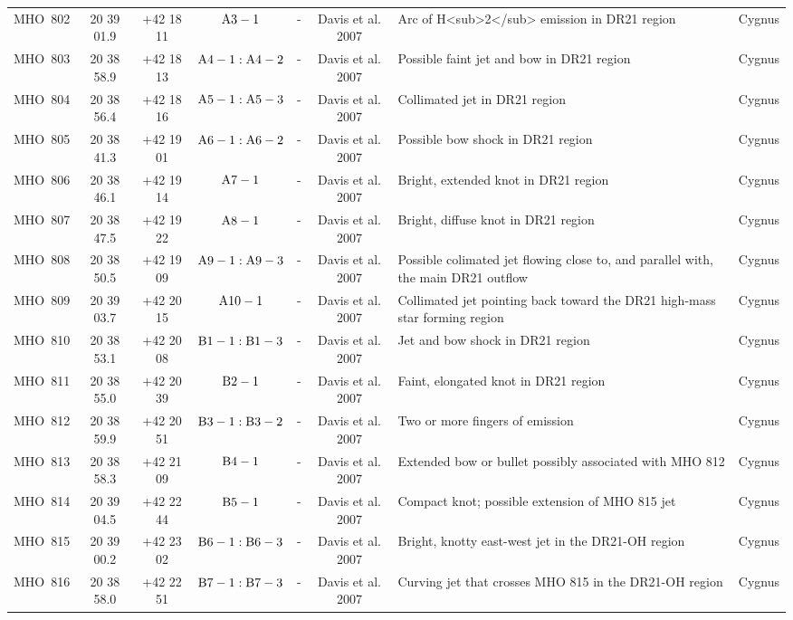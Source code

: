 \documentclass[12pt]{report}
\begin{document}
\begin{sidewaystable}
\begin{tabular}{@{}lccccclc}
MHO~802 & 20 39 01.9 & +42 18 11 & ${\rm A3-1}$ & - & Davis et al. 2007 & Arc of H<sub>2</sub> emission in DR21 region   & Cygnus \\ 
MHO~803 & 20 38 58.9 & +42 18 13 & ${\rm A4-1:A4-2}$ & - & Davis et al. 2007 & Possible faint jet and bow in DR21 region   & Cygnus \\ 
MHO~804 & 20 38 56.4 & +42 18 16 & ${\rm A5-1:A5-3}$ & - & Davis et al. 2007 & Collimated jet in DR21 region   & Cygnus \\ 
MHO~805 & 20 38 41.3 & +42 19 01 & ${\rm A6-1:A6-2}$ & - & Davis et al. 2007 & Possible bow shock in DR21 region   & Cygnus \\ 
MHO~806 & 20 38 46.1 & +42 19 14 & ${\rm A7-1}$ & - & Davis et al. 2007 & Bright, extended knot in DR21 region   & Cygnus \\ 
MHO~807 & 20 38 47.5 & +42 19 22 & ${\rm A8-1}$ & - & Davis et al. 2007 & Bright, diffuse knot in DR21 region   & Cygnus \\ 
MHO~808 & 20 38 50.5 & +42 19 09 & ${\rm A9-1:A9-3}$ & - & Davis et al. 2007 & Possible colimated jet flowing close to, and parallel with, the main DR21 outflow   & Cygnus \\ 
MHO~809 & 20 39 03.7 & +42 20 15 & ${\rm A10-1}$ & - & Davis et al. 2007 & Collimated jet pointing back toward the DR21 high-mass star forming region   & Cygnus \\ 
MHO~810 & 20 38 53.1 & +42 20 08 & ${\rm B1-1:B1-3}$ & - & Davis et al. 2007 & Jet and bow shock in DR21 region   & Cygnus \\ 
MHO~811 & 20 38 55.0 & +42 20 39 & ${\rm B2-1}$ & - & Davis et al. 2007 & Faint, elongated knot in DR21 region   & Cygnus \\ 
MHO~812 & 20 38 59.9 & +42 20 51 & ${\rm B3-1:B3-2}$ & - & Davis et al. 2007 & Two or more fingers of emission  & Cygnus \\ 
MHO~813 & 20 38 58.3 & +42 21 09 & ${\rm B4-1}$ & - & Davis et al. 2007 & Extended bow or bullet possibly associated with MHO 812  & Cygnus \\ 
MHO~814 & 20 39 04.5 & +42 22 44 & ${\rm B5-1}$ & - & Davis et al. 2007 & Compact knot; possible extension of MHO 815 jet  & Cygnus \\ 
MHO~815 & 20 39 00.2 & +42 23 02 & ${\rm B6-1:B6-3}$ & - & Davis et al. 2007 & Bright, knotty east-west jet in the DR21-OH region  & Cygnus \\ 
MHO~816 & 20 38 58.0 & +42 22 51 & ${\rm B7-1:B7-3}$ & - & Davis et al. 2007 & Curving jet that crosses MHO 815 in the DR21-OH region  & Cygnus \\ 

\end{tabular}
\end{sidewaystable}
\end{document}
